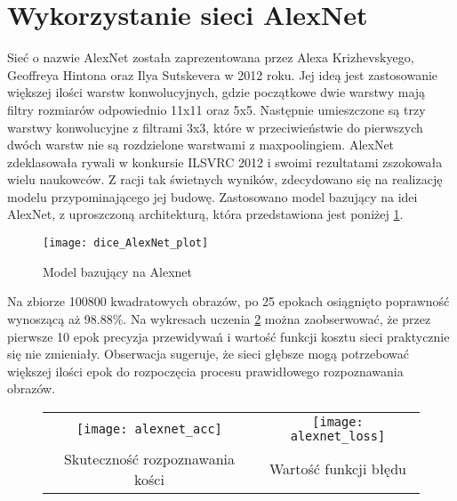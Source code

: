 \section{Wykorzystanie sieci AlexNet}
Sieć o nazwie AlexNet \cite{AlexNetNVIDIA, AlexNetdesc, AlexNetpresentation} została
zaprezentowana przez Alexa Krizhevskyego, Geoffreya Hintona oraz Ilya Sutskevera w 2012 roku.
Jej ideą jest zastosowanie większej ilości warstw konwolucyjnych, gdzie początkowe dwie warstwy
mają filtry rozmiarów odpowiednio 11x11 oraz 5x5. Następnie umieszczone są trzy warstwy
konwolucyjne z filtrami 3x3, które w przeciwieństwie do pierwszych
dwóch warstw nie są rozdzielone warstwami z maxpoolingiem. AlexNet zdeklasowała rywali
w konkursie ILSVRC 2012 i swoimi rezultatami zszokowała wielu naukowców. Z racji tak świetnych
wyników, zdecydowano się na realizację modelu przypominającego jej budowę.
Zastosowano model bazujący na idei AlexNet, z uproszczoną architekturą, która przedstawiona jest poniżej \ref{fig:alexnet}.
\newpage
\begin{figure}[h!]
\centering
\texttt{[image: dice\_AlexNet\_plot]}
\caption{Model bazujący na Alexnet}
\label{fig:alexnet}
\end{figure}
Na zbiorze 100800 kwadratowych obrazów, po 25 epokach osiągnięto poprawność wynoszącą aż 98.88\%.
Na wykresach uczenia \ref{fig:alexnet_plot} można zaobserwować, że przez pierwsze 10 epok precyzja przewidywań
i wartość funkcji kosztu sieci praktycznie się nie zmieniały. Obserwacja sugeruje, że sieci
głębsze mogą potrzebować większej ilości epok do rozpoczęcia procesu prawidłowego rozpoznawania obrazów.\\
\begin{figure}[h!]
\begin{center}
\begin{tabular}{cc}
\texttt{[image: alexnet\_acc]} &
\texttt{[image: alexnet\_loss]} \\
 Skuteczność rozpoznawania kości & Wartość funkcji błędu\\
\end{tabular}
\label{fig:alexnet_plot}
\end{center}
\end{figure}\\

